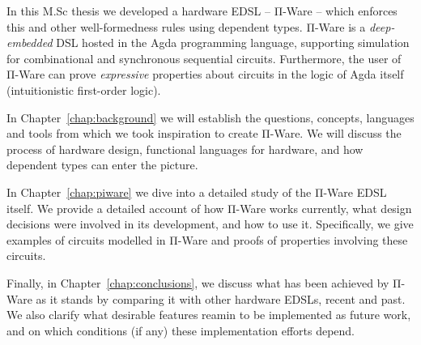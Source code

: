     In this M.Sc thesis we developed a hardware \ac{EDSL} -- Π-Ware -- which enforces this and other
    well-formedness rules using dependent types.
    Π-Ware is a \emph{deep-embedded} \ac{DSL} hosted in the Agda programming language,
    supporting simulation for combinational and synchronous sequential circuits.
    Furthermore, the user of Π-Ware can prove \emph{expressive} properties about circuits in the logic
    of Agda itself (intuitionistic first-order logic).

    In Chapter~\ref{chap:background} we will establish the questions, concepts, languages and tools
    from which we took inspiration to create Π-Ware.
    We will discuss the process of hardware design, functional languages for hardware,
    and how dependent types can enter the picture.

    In Chapter~\ref{chap:piware} we dive into a detailed study of the Π-Ware \ac{EDSL} itself.
    We provide a detailed account of how Π-Ware works currently,
    what design decisions were involved in its development, and how to use it.
    Specifically, we give examples of circuits modelled in Π-Ware and proofs of properties involving
    these circuits.

    Finally, in Chapter~\ref{chap:conclusions}, we discuss what has been achieved by Π-Ware as it stands
    by comparing it with other hardware \acp{EDSL}, recent and past.
    We also clarify what desirable features reamin to be implemented as future work,
    and on which conditions (if any) these implementation efforts depend.


